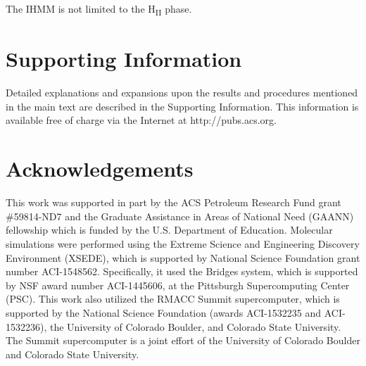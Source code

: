 \documentclass{article}
\begin{document}
  \noindent The IHMM is not limited to the H\textsubscript{II} phase.
  
  \section*{Supporting Information}

  Detailed explanations and expansions upon the results and procedures mentioned in
  the main text are described in the Supporting Information. This information is
  available free of charge via the Internet at http://pubs.acs.org.

  \section*{Acknowledgements}

  This work was supported in part by the ACS Petroleum Research Fund
  grant \#59814-ND7 and the Graduate Assistance in Areas of National Need (GAANN) 
  fellowship which is funded by the U.S. Department of Education. 
  Molecular simulations were performed using the Extreme Science and
  Engineering Discovery Environment (XSEDE), which is supported by National
  Science Foundation grant number ACI-1548562. Specifically, it used the Bridges
  system, which is supported by NSF award number ACI-1445606, at the Pittsburgh
  Supercomputing Center (PSC). This work also utilized the RMACC Summit supercomputer,
  which is supported by the National Science Foundation (awards ACI-1532235 and
  ACI-1532236), the University of Colorado Boulder, and Colorado State
  University. The Summit supercomputer is a joint effort of the University of
  Colorado Boulder and Colorado State University.

  \clearpage

  
  


\end{document}
